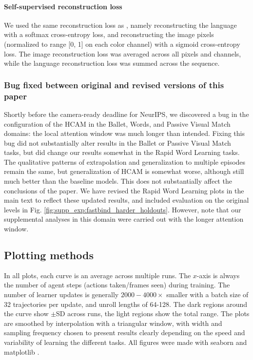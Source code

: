 \paragraph{Self-supervised reconstruction loss} We used the same reconstruction loss as \citet{hill2020grounded}, namely reconstructing the language with a softmax cross-entropy loss, and reconstructing the image pixels (normalized to range [0, 1] on each color channel) with a sigmoid cross-entropy loss. The image reconstruction loss was averaged across all pixels and channels, while the language reconstruction loss was summed across the sequence. 

\subsubsection{Bug fixed between original and revised versions of this paper} \label{app:methods:bug_fixed}

Shortly before the camera-ready deadline for NeurIPS, we discovered a bug in the configuration of the HCAM in the Ballet, Words, and Passive Visual Match domains: the local attention window was much longer than intended. Fixing this bug did not substantially alter results in the Ballet or Passive Visual Match tasks, but did change our results somewhat in the Rapid Word Learning tasks. The qualitative patterns of extrapolation and generalization to multiple episodes remain the same, but generalization of HCAM is somewhat worse, although still much better than the baseline models. This does not substantially affect the conclusions of the paper. We have revised the Rapid Word Learning plots in the main text to reflect these updated results, and included evaluation on the original levels in Fig. \ref{fig:supp_exp:fastbind_harder_holdouts}. However, note that our supplemental analyses in this domain were carried out with the longer attention window.

\subsection{Plotting methods}
In all plots, each curve is an average across multiple runs. The \(x\)-axis is always the number of agent steps (actions taken/frames seen) during training. The number of learner updates is generally \(2000-4000\times\) smaller with a batch size of 32 trajectories per update, and unroll lengths of 64-128. The dark regions around the curve show \(\pm\)SD across runs, the light regions show the total range. The plots are smoothed by interpolation with a triangular window, with width and sampling frequency chosen to present results clearly depending on the speed and variability of learning the different tasks. All figures were made with seaborn \citep{Waskom2021} and matplotlib \citep{Hunter2007}.

